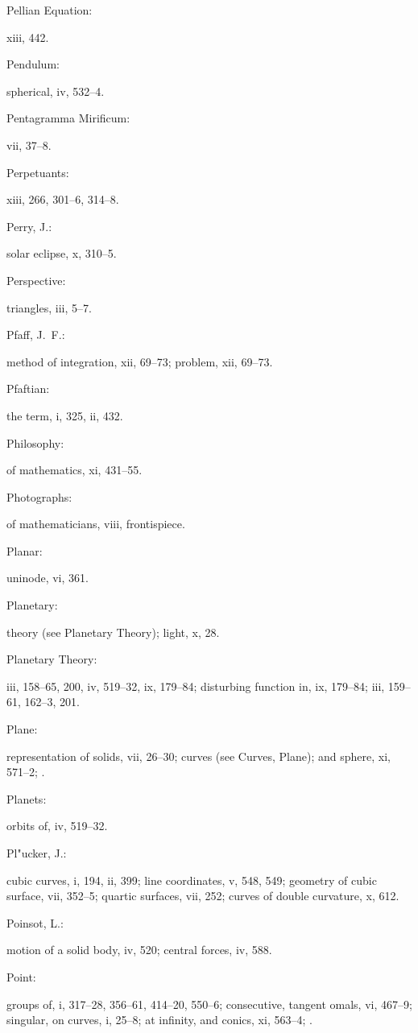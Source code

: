 \documentclass[11pt,a4paper]{book}
\providecommand{\V}[1]{#1}
\providecommand{\IndexEntry}[2]{#1\dotfill #2\par}
\begin{document}
\IndexEntry{Pellian Equation}: \V{xiii}, 442.

\IndexEntry{Pendulum}: spherical, \V{iv}, 532--4.

\IndexEntry{Pentagramma Mirificum}: \V{vii}, 37--8.

\IndexEntry{Perpetuants}: \V{xiii}, 266, 301--6, 314--8.

\IndexEntry{Perry, J.}: solar eclipse, \V{x}, 310--5.

\IndexEntry{Perspective}: triangles, \V{iii}, 5--7.

\IndexEntry{Pfaff, J.\ F.}: method of integration, \V{xii}, 69--73; problem, \V{xii}, 69--73.

\IndexEntry{Pfaftian}: the term, \V{i}, 325, \V{ii}, 432.

\IndexEntry{Philosophy}: of mathematics, \V{xi}, 431--55.

\IndexEntry{Photographs}: of mathematicians, \V{viii}, frontispiece.

\IndexEntry{Planar}: uninode, \V{vi}, 361.

\IndexEntry{Planetary}: theory (see Planetary Theory); light, \V{x}, 28.

\IndexEntry{Planetary Theory}: \V{iii}, 158--65, 200, \V{iv}, 519--32, \V{ix}, 179--84; disturbing function in, \V{ix}, 179--84; \V{iii}, 159--61, 162--3, 201.

\IndexEntry{Plane}: representation of solids, \V{vii}, 26--30; curves (see Curves, Plane); and sphere, \V{xi}, 571--2; .

\IndexEntry{Planets}: orbits of, \V{iv}, 519--32.

\newpage

\setcounter{page}{117}

\IndexEntry{Pl"ucker, J.}: cubic curves, \V{i}, 194, \V{ii}, 399; line coordinates, \V{v}, 548, 549; geometry of cubic surface, \V{vii}, 352--5; quartic surfaces, \V{vii}, 252; curves of double curvature, \V{x}, 612.

\IndexEntry{Poinsot, L.}: motion of a solid body, \V{iv}, 520; central forces, \V{iv}, 588.

\IndexEntry{Point}: groups of, \V{i}, 317--28, 356--61, 414--20, 550--6; consecutive, tangent omals, \V{vi}, 467--9; singular, on curves, \V{i}, 25--8; at infinity, and conics, \V{xi}, 563--4; .
\end{document}
